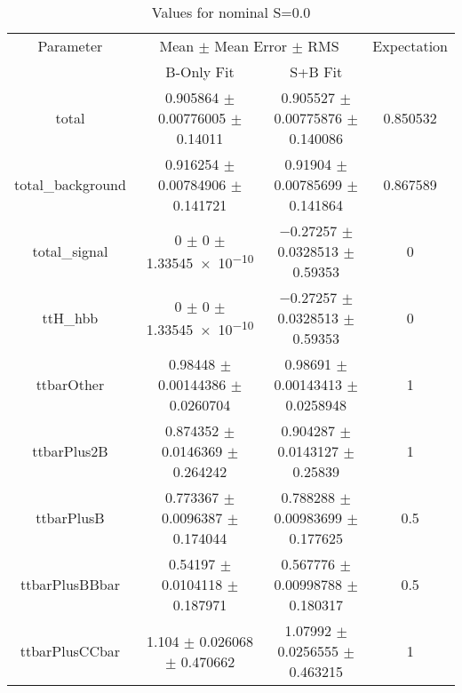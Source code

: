\begin{table}
\centering
\caption{Values for nominal S=0.0}
\begin{tabular}{cccc}
\toprule
Parameter & \multicolumn{2}{c}{Mean $\pm$ Mean Error $\pm$ RMS} & Expectation\\
 & B-Only Fit & S+B Fit & \\
\midrule
total & \num{0.905864} $\pm$ \num{0.00776005} $\pm$ \num{0.14011} & \num{0.905527} $\pm$ \num{0.00775876} $\pm$ \num{0.140086} & \num{0.850532}\\
total\_background & \num{0.916254} $\pm$ \num{0.00784906} $\pm$ \num{0.141721} & \num{0.91904} $\pm$ \num{0.00785699} $\pm$ \num{0.141864} & \num{0.867589}\\
total\_signal & \num{0} $\pm$ \num{0} $\pm$ \num{1.33545e-10} & \num{-0.27257} $\pm$ \num{0.0328513} $\pm$ \num{0.59353} & \num{0}\\
ttH\_hbb & \num{0} $\pm$ \num{0} $\pm$ \num{1.33545e-10} & \num{-0.27257} $\pm$ \num{0.0328513} $\pm$ \num{0.59353} & \num{0}\\
ttbarOther & \num{0.98448} $\pm$ \num{0.00144386} $\pm$ \num{0.0260704} & \num{0.98691} $\pm$ \num{0.00143413} $\pm$ \num{0.0258948} & \num{1}\\
ttbarPlus2B & \num{0.874352} $\pm$ \num{0.0146369} $\pm$ \num{0.264242} & \num{0.904287} $\pm$ \num{0.0143127} $\pm$ \num{0.25839} & \num{1}\\
ttbarPlusB & \num{0.773367} $\pm$ \num{0.0096387} $\pm$ \num{0.174044} & \num{0.788288} $\pm$ \num{0.00983699} $\pm$ \num{0.177625} & \num{0.5}\\
ttbarPlusBBbar & \num{0.54197} $\pm$ \num{0.0104118} $\pm$ \num{0.187971} & \num{0.567776} $\pm$ \num{0.00998788} $\pm$ \num{0.180317} & \num{0.5}\\
ttbarPlusCCbar & \num{1.104} $\pm$ \num{0.026068} $\pm$ \num{0.470662} & \num{1.07992} $\pm$ \num{0.0256555} $\pm$ \num{0.463215} & \num{1}\\
\bottomrule
\end{tabular}
\end{table}